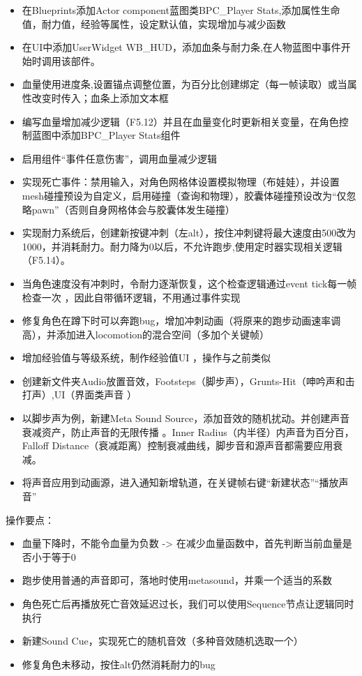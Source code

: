 \documentclass[11pt,oneside]{book}
\begin{document}
\begin{itemize}
    \item 在Blueprints添加Actor component蓝图类BPC\_Player Stats,添加属性生命值，耐力值，经验等属性，设定默认值，实现增加与减少函数
    \item 在UI中添加UserWidget WB\_HUD，添加血条与耐力条,在人物蓝图中事件开始时调用该部件。
    \item 血量使用进度条,设置锚点调整位置，为百分比创建绑定（每一帧读取）或当属性改变时传入；血条上添加文本框
    \item 编写血量增加减少逻辑（F5.12）并且在血量变化时更新相关变量，在角色控制蓝图中添加BPC\_Player Stats组件
    \item 启用组件“事件任意伤害”，调用血量减少逻辑
    \item 实现死亡事件：禁用输入，对角色网格体设置模拟物理（布娃娃），并设置mesh碰撞预设为自定义，启用碰撞（查询和物理），胶囊体碰撞预设改为“仅忽略pawn”（否则自身网格体会与胶囊体发生碰撞）
    \item 实现耐力系统后，创建新按键冲刺（左alt），按住冲刺键将最大速度由500改为1000，并消耗耐力。耐力降为0以后，不允许跑步,使用定时器实现相关逻辑（F5.14）。
    \item 当角色速度没有冲刺时，令耐力逐渐恢复，这个检查逻辑通过event tick每一帧检查一次 ，因此自带循环逻辑，不用通过事件实现
    \item 修复角色在蹲下时可以奔跑bug，增加冲刺动画（将原来的跑步动画速率调高），并添加进入locomotion的混合空间（多加个关键帧）
    \item 增加经验值与等级系统，制作经验值UI ，操作与之前类似
    \item 创建新文件夹Audio放置音效，Footsteps（脚步声），Grunts-Hit（呻吟声和击打声）,UI（界面类声音 ）
    \item 以脚步声为例，新建Meta Sound Source，添加音效的随机扰动。并创建声音衰减资产，防止声音的无限传播 。Inner Radius（内半径）内声音为百分百，Falloff Distance（衰减距离）控制衰减曲线，脚步音和源声音都需要应用衰减。
    \item 将声音应用到动画源，进入通知新增轨道，在关键帧右键“新建状态”“播放声音”

\end{itemize}

操作要点：
\begin{itemize}
    \item 血量下降时，不能令血量为负数 -> 在减少血量函数中，首先判断当前血量是否小于等于0
    \item 跑步使用普通的声音即可，落地时使用metasound，并乘一个适当的系数
    \item 角色死亡后再播放死亡音效延迟过长，我们可以使用Sequence节点让逻辑同时执行
    \item 新建Sound Cue，实现死亡的随机音效（多种音效随机选取一个）
    \item 修复角色未移动，按住alt仍然消耗耐力的bug 

\end{itemize}
\end{document}
